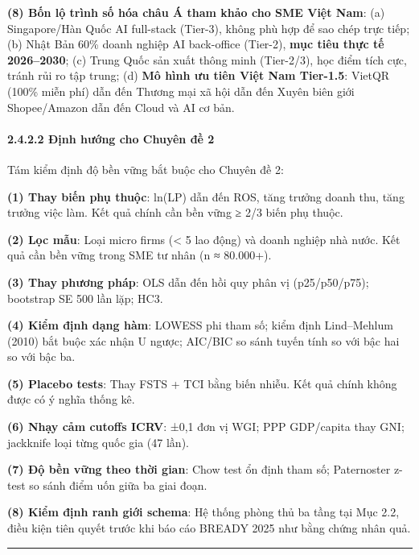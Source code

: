 \documentclass[12pt,a4paper]{article}
\begin{document}
\textbf{(8) Bốn lộ trình số hóa châu Á tham khảo cho SME Việt Nam}: (a)
Singapore/Hàn Quốc AI full-stack (Tier-3), không phù hợp để sao chép
trực tiếp; (b) Nhật Bản 60\% doanh nghiệp AI back-office (Tier-2),
\textbf{mục tiêu thực tế 2026--2030}; (c) Trung Quốc sản xuất thông minh
(Tier-2/3), học điểm tích cực, tránh rủi ro tập trung; (d) \textbf{Mô
hình ưu tiên Việt Nam Tier-1.5}: VietQR (100\% miễn phí) dẫn đến Thương
mại xã hội dẫn đến Xuyên biên giới Shopee/Amazon dẫn đến Cloud và AI cơ
bản.

\hypertarget{2422-ux111ux1ecbnh-hux1b0ux1edbng-cho-chuyuxean-ux111ux1ec1-2}{%
\paragraph{2.4.2.2 Định hướng cho Chuyên đề
2}\label{2422-ux111ux1ecbnh-hux1b0ux1edbng-cho-chuyuxean-ux111ux1ec1-2}}

Tám kiểm định độ bền vững bắt buộc cho Chuyên đề 2:

\textbf{(1) Thay biến phụ thuộc}: ln(LP) dẫn đến ROS, tăng trưởng doanh
thu, tăng trưởng việc làm. Kết quả chính cần bền vững ≥ 2/3 biến phụ
thuộc.

\textbf{(2) Lọc mẫu}: Loại micro firms (\textless{} 5 lao động) và doanh
nghiệp nhà nước. Kết quả cần bền vững trong SME tư nhân (n ≈ 80.000+).

\textbf{(3) Thay phương pháp}: OLS dẫn đến hồi quy phân vị
(p25/p50/p75); bootstrap SE 500 lần lặp; HC3.

\textbf{(4) Kiểm định dạng hàm}: LOWESS phi tham số; kiểm định
Lind--Mehlum (2010) bắt buộc xác nhận U ngược; AIC/BIC so sánh tuyến
tính so với bậc hai so với bậc ba.

\textbf{(5) Placebo tests}: Thay FSTS + TCI bằng biến nhiễu. Kết quả
chính không được có ý nghĩa thống kê.

\textbf{(6) Nhạy cảm cutoffs ICRV}: ±0,1 đơn vị WGI; PPP GDP/capita thay
GNI; jackknife loại từng quốc gia (47 lần).

\textbf{(7) Độ bền vững theo thời gian}: Chow test ổn định tham số;
Paternoster z-test so sánh điểm uốn giữa ba giai đoạn.

\textbf{(8) Kiểm định ranh giới schema}: Hệ thống phòng thủ ba tầng tại
Mục 2.2, điều kiện tiên quyết trước khi báo cáo BREADY 2025 như bằng
chứng nhân quả.

\begin{center}\rule{0.5\linewidth}{0.5pt}\end{center}
\end{document}
